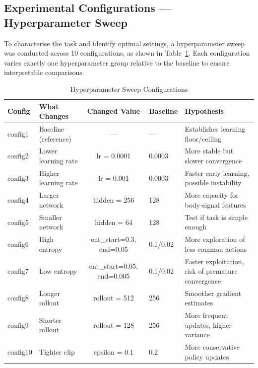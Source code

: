 \documentclass[../report.tex]{subfiles}
\begin{document}
    \subsection{Experimental Configurations — Hyperparameter Sweep}

    To characterise the task and identify optimal settings, a hyperparameter sweep was conducted across 10 configurations, as shown in Table~\ref{tab:variants}. Each configuration varies exactly one hyperparameter group relative to the baseline to ensure interpretable comparisons.

    \begin{table}[t]
        \centering
        \caption{Hyperparameter Sweep Configurations}
        \label{tab:variants}
        \begin{tabular}{llcll}
            \toprule
            \textbf{Config} & \textbf{What Changes} & \textbf{Changed Value} & \textbf{Baseline} & \textbf{Hypothesis} \\
            \midrule
            config1 & Baseline (reference) & --- & --- & Establishes learning floor/ceiling \\
            config2 & Lower learning rate & lr = 0.0001 & 0.0003 & More stable but slower convergence \\
            config3 & Higher learning rate & lr = 0.001 & 0.0003 & Faster early learning, possible instability \\
            config4 & Larger network & hidden = 256 & 128 & More capacity for body-signal features \\
            config5 & Smaller network & hidden = 64 & 128 & Test if task is simple enough \\
            config6 & High entropy & ent\_start=0.3, end=0.05 & 0.1/0.02 & More exploration of less common actions \\
            config7 & Low entropy & ent\_start=0.05, end=0.005 & 0.1/0.02 & Faster exploitation, risk of premature convergence \\
            config8 & Longer rollout & rollout = 512 & 256 & Smoother gradient estimates \\
            config9 & Shorter rollout & rollout = 128 & 256 & More frequent updates, higher variance \\
            config10 & Tighter clip & epsilon = 0.1 & 0.2 & More conservative policy updates \\
            \bottomrule
        \end{tabular}
    \end{table}
\end{document}
